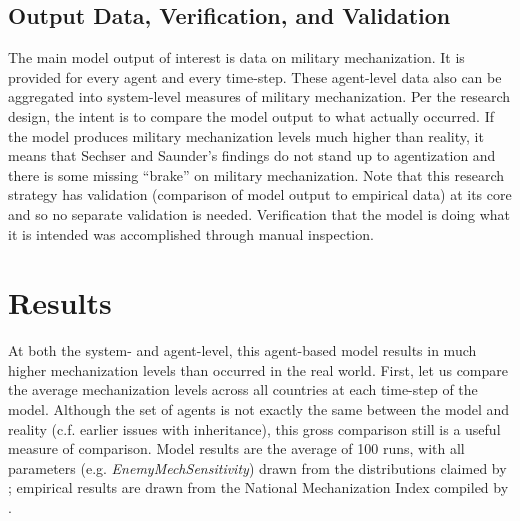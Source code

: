\documentclass{article}
\begin{document}
\subsection{Output Data, Verification, and Validation}

The main model output of interest is data on military mechanization. It is provided for
every agent and every time-step. These agent-level data also can be aggregated
into system-level measures of military mechanization. Per the research design,
the intent is to compare the model output to what actually occurred. If the
model produces military mechanization levels much higher than reality, it means
that Sechser and Saunder's findings do not stand up to agentization and there is
some missing ``brake'' on military mechanization. Note that this research
strategy has validation (comparison of model output to empirical data) at its
core and so no separate validation is needed. Verification that the model is
doing what it is intended was accomplished through manual inspection.

\section{Results}

At both the system- and agent-level, this agent-based model results in much
higher mechanization levels than occurred in the real world. First, let us
compare the average mechanization levels across all countries at each time-step
of the model. Although the set of agents is not exactly the same between the
model and reality (c.f. earlier issues with inheritance), this
gross comparison still is a useful measure of comparison. Model results are
the average of 100 runs, with all parameters (e.g.
\textit{EnemyMechSensitivity}) drawn from the distributions claimed by
\citet{sechser2010army}; empirical results are drawn from the National
Mechanization Index compiled by \citet{sechser2010army}.
\end{document}
